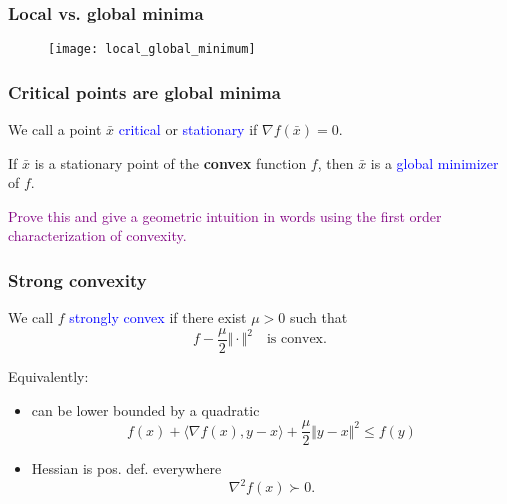 \documentclass{beamer}
\begin{document}
\begin{frame}
  \frametitle{Local vs. global minima}
  \begin{figure}[ht]
    \centering
    \texttt{[image: local\_global\_minimum]}
  \end{figure}


\end{frame}


\begin{frame}
  \frametitle{Critical points are global minima}

  \begin{definition}
    We call a point $\bar{x}$ \textcolor{blue}{critical} or \textcolor{blue}{stationary} if
    $\nabla f(\bar{x}) = 0$.
  \end{definition}
  \begin{lemma}%
    If $\bar{x}$ is a stationary point of the \textbf{convex} function $f$, then $\bar{x}$ is a \textcolor{blue}{global minimizer} of $f$.
  \end{lemma}
  \textcolor{purple}{Prove this and give a geometric intuition in words using the first order characterization of convexity.}

\end{frame}


\begin{frame}
  \frametitle{Strong convexity}
  \begin{definition}
    We call $f$ \textcolor{blue}{strongly convex} if there exist $\mu> 0$ such that
    \begin{equation}
      f - \frac{\mu}{2} \Vert \cdot \Vert^2 \quad \text{is convex.}
    \end{equation}
  \end{definition}

  Equivalently:
  \begin{itemize}
    \item can be lower bounded by a quadratic
          \begin{equation}
            f(x) + \langle \nabla f(x), y-x \rangle + \frac{\mu}{2} \Vert y-x \Vert^2 \le f(y)
          \end{equation}
    \item Hessian is pos. def. everywhere
          \begin{equation}
            \nabla^2 f(x) \succ 0.
          \end{equation}
  \end{itemize}

\end{frame}
\end{document}
